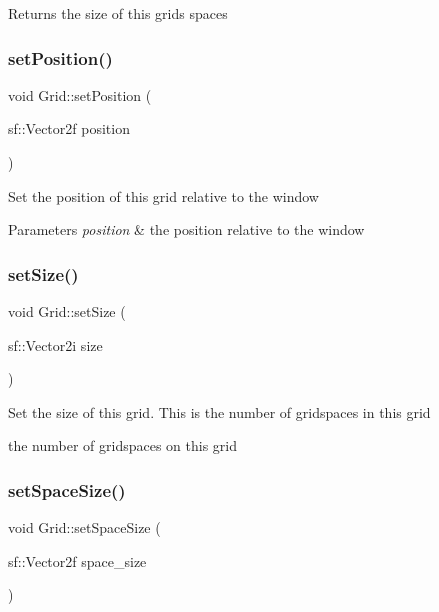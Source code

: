 \begin{DoxyReturn}{Returns}
the size of this grid\textquotesingle{}s spaces 
\end{DoxyReturn}
\mbox{\label{classGrid_a346fbade99f7202d870980a32f7e3290}} 
\subsubsection{\texorpdfstring{set\+Position()}{setPosition()}}
{\footnotesize\ttfamily void Grid\+::set\+Position (\begin{DoxyParamCaption}\item[{sf\+::\+Vector2f}]{position }\end{DoxyParamCaption})}

Set the position of this grid relative to the window


\begin{DoxyParams}{Parameters}
{\em position} & the position relative to the window \\
\hline
\end{DoxyParams}
\mbox{\label{classGrid_ad709414fa82c4a0d429244333625c5d4}} 
\subsubsection{\texorpdfstring{set\+Size()}{setSize()}}
{\footnotesize\ttfamily void Grid\+::set\+Size (\begin{DoxyParamCaption}\item[{sf\+::\+Vector2i}]{size }\end{DoxyParamCaption})}

Set the size of this grid. This is the number of gridspaces in this grid

the number of gridspaces on this grid \mbox{\label{classGrid_ae53bf0b9448b14028ae225cb5f00c00c}} 
\subsubsection{\texorpdfstring{set\+Space\+Size()}{setSpaceSize()}}
{\footnotesize\ttfamily void Grid\+::set\+Space\+Size (\begin{DoxyParamCaption}\item[{sf\+::\+Vector2f}]{space\+\_\+size }\end{DoxyParamCaption})}

